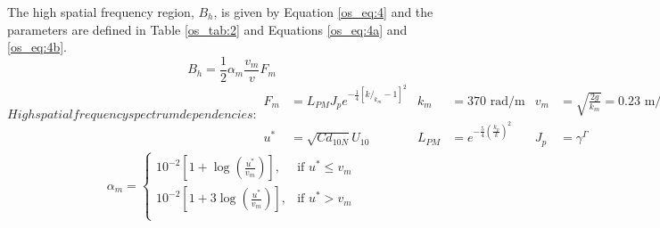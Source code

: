 The high spatial frequency region, $B_h$, is given by Equation \ref{os_eq:4} and the parameters are defined in Table \ref{os_tab:2} and Equations \ref{os_eq:4a} and \ref{os_eq:4b}.
\begin{equation}
  \label{os_eq:4}
 B_h = \frac{1}{2} \alpha_m \frac{v_m}{v} F_m
\end{equation}
\renewcommand{\baselinestretch}{2} \small\normalsize
\begin{subequations}
\label{os_eq:4a}
   High spatial frequency spectrum dependencies:
\begin{align}
  F_m &= L_{PM}J_pe^{-\frac{1}{4}\left[k/_{k_m} - 1 \right]^2 } & k_m & = 370 \text{ rad/m} &  v_m &=\sqrt{\frac{2g}{k_m}} = 0.23 \text{ m/s} \\
  u^* &= \sqrt{Cd_{10N}}U_{10}  & L_{PM} &=e^{-\frac{5}{4}\left(\frac{k_p}{k} \right)^2}  &  J_p &= \gamma^\Gamma
\end{align}
\end{subequations}
\renewcommand{\baselinestretch}{2} \small\normalsize
\begin{equation}
\begin{gathered}
  \label{os_eq:4b}
   \alpha_m= \begin{cases}
    10^{-2}\left[1 + \log\left(\frac{u^*}{v_m} \right) \right],& \text{if } u^* \leq v_m\\
    10^{-2}\left[1 + 3\log\left(\frac{u^*}{v_m} \right) \right], & \text{if } u^* > v_m\\
  \end{cases}
\end{gathered}
\end{equation}
\renewcommand{\baselinestretch}{2} \small\normalsize

